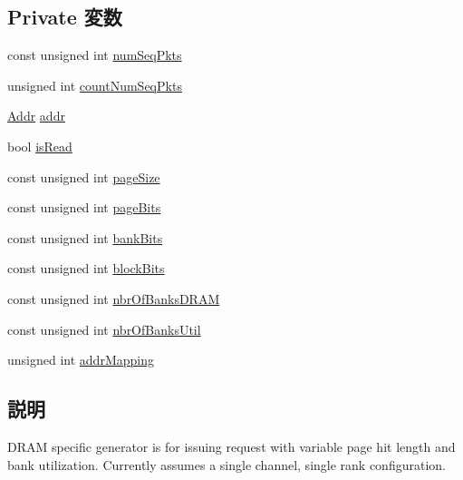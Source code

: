 \subsection*{Private 変数}
\begin{DoxyCompactItemize}
\item 
const unsigned int \hyperlink{classDramGen_a3904e98c281ec13010eaf9fe0671cda4}{numSeqPkts}
\item 
unsigned int \hyperlink{classDramGen_afe76fc6f68d7bc6df6e5757cbc74d949}{countNumSeqPkts}
\item 
\hyperlink{base_2types_8hh_af1bb03d6a4ee096394a6749f0a169232}{Addr} \hyperlink{classDramGen_a0bb77b4ba61e408313e1118250f9278c}{addr}
\item 
bool \hyperlink{classDramGen_a1ba0c9f9857ad696d8c3cd03de468fae}{isRead}
\item 
const unsigned int \hyperlink{classDramGen_a0a5d2b9bad523ef4f6c613e9955c461d}{pageSize}
\item 
const unsigned int \hyperlink{classDramGen_a91979f75432119c425a60258ae2fae8f}{pageBits}
\item 
const unsigned int \hyperlink{classDramGen_a501bda29f816788d3bba6d280d6fdc94}{bankBits}
\item 
const unsigned int \hyperlink{classDramGen_a5f384954184da222f096688b1a3cc7a5}{blockBits}
\item 
const unsigned int \hyperlink{classDramGen_aad527c6f300f25a1ee8484deaba3d63c}{nbrOfBanksDRAM}
\item 
const unsigned int \hyperlink{classDramGen_ad0a8571226776987fe09f08baf268a06}{nbrOfBanksUtil}
\item 
unsigned int \hyperlink{classDramGen_ad03c09dad8f497cd0d9fb1a58500acab}{addrMapping}
\end{DoxyCompactItemize}


\subsection{説明}
DRAM specific generator is for issuing request with variable page hit length and bank utilization. Currently assumes a single channel, single rank configuration. 

